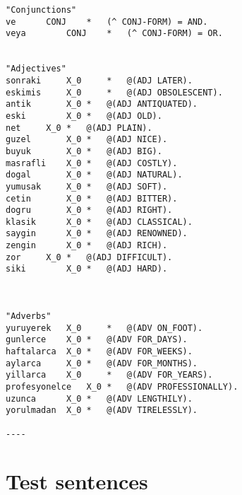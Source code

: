 \begin{lstlisting}
"Conjunctions"		  		
ve	 	CONJ 	* 	(^ CONJ-FORM) = AND.
veya	 	CONJ 	* 	(^ CONJ-FORM) = OR.


"Adjectives"
sonraki  	X_0  	*  	@(ADJ LATER).
eskimis  	X_0  	*  	@(ADJ OBSOLESCENT).
antik		X_0	*	@(ADJ ANTIQUATED).
eski		X_0	*	@(ADJ OLD).
net		X_0	*	@(ADJ PLAIN).
guzel		X_0	*	@(ADJ NICE).
buyuk		X_0	*	@(ADJ BIG).
masrafli	X_0	*	@(ADJ COSTLY).
dogal		X_0	*	@(ADJ NATURAL).
yumusak		X_0	*	@(ADJ SOFT). 
cetin		X_0	*	@(ADJ BITTER).
dogru		X_0	*	@(ADJ RIGHT).
klasik		X_0	*	@(ADJ CLASSICAL).
saygin		X_0	*	@(ADJ RENOWNED).
zengin		X_0	*	@(ADJ RICH).
zor		X_0	*	@(ADJ DIFFICULT).
siki		X_0	*	@(ADJ HARD).



"Adverbs"
yuruyerek 	X_0  	*  	@(ADV ON_FOOT).
gunlerce	X_0	*	@(ADV FOR_DAYS).
haftalarca	X_0	*	@(ADV FOR_WEEKS).
aylarca		X_0	*	@(ADV FOR_MONTHS).
yillarca	X_0  	*  	@(ADV FOR_YEARS).
profesyonelce	X_0	*	@(ADV PROFESSIONALLY).
uzunca		X_0	*	@(ADV LENGTHILY).
yorulmadan 	X_0	*	@(ADV TIRELESSLY).

----
\end{lstlisting}


\section{Test sentences}
\label{appendixc:testsentences}

